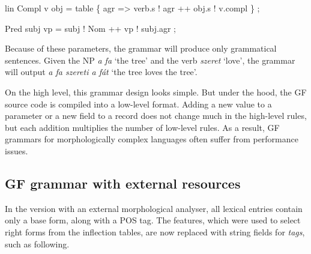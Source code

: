 \documentclass[10pt,a4paper]{article}
\newenvironment{Shaded}{\begin{snugshade}}{\end{snugshade}}
\newcommand{\DataTypeTok}[1]{\textcolor[rgb]{0.13,0.29,0.53}{{#1}}}
\newcommand{\OtherTok}[1]{\textcolor[rgb]{0.56,0.35,0.01}{{#1}}}
\newcommand{\FunctionTok}[1]{\textcolor[rgb]{0.00,0.00,0.00}{{#1}}}
\newcommand{\NormalTok}[1]{{#1}}
\begin{document}
\begin{Shaded}
\begin{Highlighting}[]
  \NormalTok{lin }
    \DataTypeTok{Compl} \NormalTok{v obj }\FunctionTok{=}
     \NormalTok{table \{ agr }\OtherTok{=>} \NormalTok{verb}\FunctionTok{.}\NormalTok{s }\FunctionTok{!} \NormalTok{agr}
                 \FunctionTok{++} \NormalTok{obj}\FunctionTok{.}\NormalTok{s }\FunctionTok{!} \NormalTok{v}\FunctionTok{.}\NormalTok{compl \} ;}

    \DataTypeTok{Pred} \NormalTok{subj vp }\FunctionTok{=} \NormalTok{subj }\FunctionTok{!} \DataTypeTok{Nom} 
                \FunctionTok{++} \NormalTok{vp }\FunctionTok{!} \NormalTok{subj}\FunctionTok{.}\NormalTok{agr ;}
\end{Highlighting}
\end{Shaded}




Because of these parameters, the grammar will produce only grammatical
sentences. Given the NP \emph{a fa} `the tree' and the verb
\emph{szeret} `love', the grammar will output \emph{a fa szereti a
  f\'{a}t} `the tree loves the tree'.

On the high level, this grammar design looks simple. 
But under the hood, the GF source code is compiled into a low-level
format. Adding a new value to a parameter or a new field to a record 
does not change much in the high-level rules, but each addition
multiplies the number of low-level rules. As a result, GF grammars for
morphologically complex languages often suffer from performance issues.


\subsection{GF grammar with external resources}
\label{sec:GFext}

In the version with an external morphological analyser, all lexical
entries contain only a base form, along with a POS tag. The features,
which were used to select right forms from the inflection tables, are
now replaced with string fields for \emph{tags}, such as following.
\end{document}
